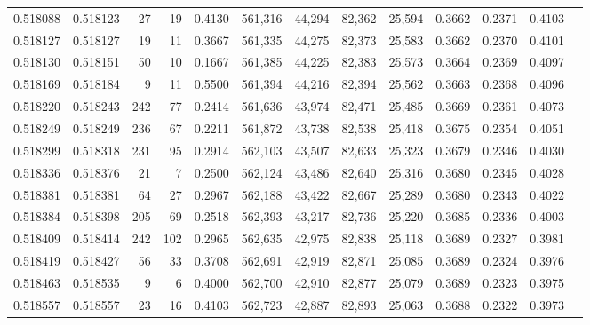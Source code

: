 \begin{tabular}{rrrrrrrrrrrrr}
0.518088 & 0.518123 &    27 &    19 &                                     0.4130 & 561,316 &  44,294 &  82,362 &  25,594 & 0.3662 & 0.2371 & 0.4103 \\
0.518127 & 0.518127 &    19 &    11 &                                     0.3667 & 561,335 &  44,275 &  82,373 &  25,583 & 0.3662 & 0.2370 & 0.4101 \\
0.518130 & 0.518151 &    50 &    10 &                                     0.1667 & 561,385 &  44,225 &  82,383 &  25,573 & 0.3664 & 0.2369 & 0.4097 \\
0.518169 & 0.518184 &     9 &    11 &                                     0.5500 & 561,394 &  44,216 &  82,394 &  25,562 & 0.3663 & 0.2368 & 0.4096 \\
0.518220 & 0.518243 &   242 &    77 &                                     0.2414 & 561,636 &  43,974 &  82,471 &  25,485 & 0.3669 & 0.2361 & 0.4073 \\
0.518249 & 0.518249 &   236 &    67 &                                     0.2211 & 561,872 &  43,738 &  82,538 &  25,418 & 0.3675 & 0.2354 & 0.4051 \\
0.518299 & 0.518318 &   231 &    95 &                                     0.2914 & 562,103 &  43,507 &  82,633 &  25,323 & 0.3679 & 0.2346 & 0.4030 \\
0.518336 & 0.518376 &    21 &     7 &                                     0.2500 & 562,124 &  43,486 &  82,640 &  25,316 & 0.3680 & 0.2345 & 0.4028 \\
0.518381 & 0.518381 &    64 &    27 &                                     0.2967 & 562,188 &  43,422 &  82,667 &  25,289 & 0.3680 & 0.2343 & 0.4022 \\
0.518384 & 0.518398 &   205 &    69 &                                     0.2518 & 562,393 &  43,217 &  82,736 &  25,220 & 0.3685 & 0.2336 & 0.4003 \\
0.518409 & 0.518414 &   242 &   102 &                                     0.2965 & 562,635 &  42,975 &  82,838 &  25,118 & 0.3689 & 0.2327 & 0.3981 \\
0.518419 & 0.518427 &    56 &    33 &                                     0.3708 & 562,691 &  42,919 &  82,871 &  25,085 & 0.3689 & 0.2324 & 0.3976 \\
0.518463 & 0.518535 &     9 &     6 &                                     0.4000 & 562,700 &  42,910 &  82,877 &  25,079 & 0.3689 & 0.2323 & 0.3975 \\
0.518557 & 0.518557 &    23 &    16 &                                     0.4103 & 562,723 &  42,887 &  82,893 &  25,063 & 0.3688 & 0.2322 & 0.3973 \\

\end{tabular}
